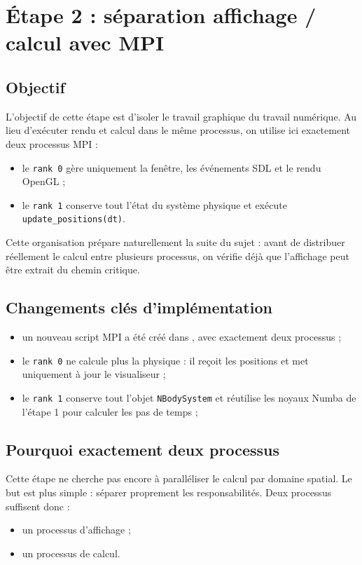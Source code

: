 \section{Étape 2 : séparation affichage / calcul avec MPI}

\subsection{Objectif}

L'objectif de cette étape est d'isoler le travail graphique du travail numérique. Au lieu d'exécuter rendu et calcul dans le même processus, on utilise ici exactement deux processus MPI :
\begin{itemize}
    \item le \texttt{rank 0} gère uniquement la fenêtre, les événements SDL et le rendu OpenGL ;
    \item le \texttt{rank 1} conserve tout l'état du système physique et exécute \texttt{update\_positions(dt)}.
\end{itemize}

Cette organisation prépare naturellement la suite du sujet : avant de distribuer réellement le calcul entre plusieurs processus, on vérifie déjà que l'affichage peut être extrait du chemin critique.

\subsection{Changements clés d'implémentation}

\begin{itemize}
    \item un nouveau script MPI a été créé dans , avec exactement deux processus ;
    \item le \texttt{rank 0} ne calcule plus la physique : il reçoit les positions et met uniquement à jour le visualiseur ;
    \item le \texttt{rank 1} conserve tout l'objet \texttt{NBodySystem} et réutilise les noyaux Numba de l'étape 1 pour calculer les pas de temps ;
\end{itemize}

\subsection{Pourquoi exactement deux processus}

Cette étape ne cherche pas encore à paralléliser le calcul par domaine spatial. Le but est plus simple : séparer proprement les responsabilités. Deux processus suffisent donc :
\begin{itemize}
    \item un processus d'affichage ;
    \item un processus de calcul.
\end{itemize}

